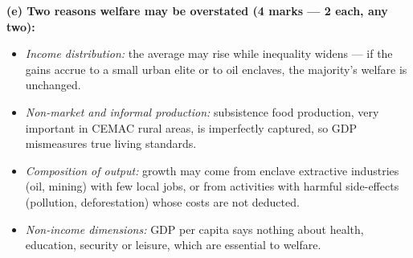 \documentclass[11pt]{article}
\begin{document}
\begin{corrige}
\textbf{(e) Two reasons welfare may be overstated (4 marks — 2 each, any two):}
\begin{itemize}
\item \emph{Income distribution:} the average may rise while inequality widens — if the gains accrue to a small urban elite or to oil enclaves, the majority's welfare is unchanged.
\item \emph{Non-market and informal production:} subsistence food production, very important in CEMAC rural areas, is imperfectly captured, so GDP mismeasures true living standards.
\item \emph{Composition of output:} growth may come from enclave extractive industries (oil, mining) with few local jobs, or from activities with harmful side-effects (pollution, deforestation) whose costs are not deducted.
\item \emph{Non-income dimensions:} GDP per capita says nothing about health, education, security or leisure, which are essential to welfare.
\end{itemize}
\end{corrige}
\end{document}

